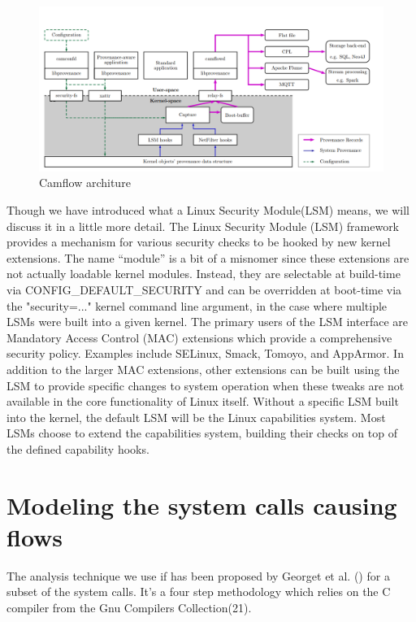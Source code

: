 \begin{figure}
	\centering
	\includegraphics[width=0.7\linewidth]{camflow}
	\caption[Architecture overview]{Camflow architure}
	\label{fig:camflow}
\end{figure}


\label{Introduction}
Though we have introduced what a Linux Security Module(LSM) means, we will discuss it in a little more detail. The Linux Security Module (LSM) framework provides a mechanism for various security checks to be hooked by new kernel extensions. The name “module” is a bit of a misnomer since these extensions are not actually loadable kernel modules. Instead, they are selectable at build-time via CONFIG\_DEFAULT\_SECURITY and can be overridden at boot-time via the "security=..." kernel command line argument, in the case where multiple LSMs were built into a given kernel.
\vskip 0.1in 
The primary users of the LSM interface are Mandatory Access Control (MAC) extensions which provide a comprehensive security policy. Examples include SELinux, Smack, Tomoyo, and AppArmor. In addition to the larger MAC extensions, other extensions can be built using the LSM to provide specific changes to system operation when these tweaks are not available in the core functionality of Linux itself.
\vskip 0.1in
Without a specific LSM built into the kernel, the default LSM will be the Linux capabilities system. Most LSMs choose to extend the capabilities system, building their checks on top of the defined capability hooks.





\section{Modeling the system calls causing flows}
The analysis technique we use if has been proposed by Georget et al. () for a subset of the system calls. It's a four step methodology which relies on the C compiler from the Gnu Compilers Collection(21). 

